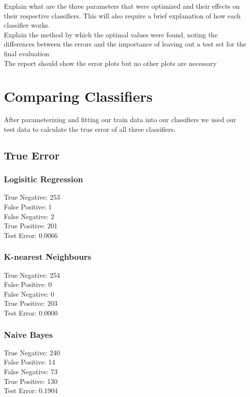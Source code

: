 \documentclass[a4paper]{article}
\newcommand\tab[1][1cm]{\hspace*{#1}}
\begin{document}
Explain what are the three parameters that were optimized and their
effects on their respective classifiers. This will also require a
brief explanation of how each classifier works.\\
Explain the method by which the optimal values were found, noting
the differences between the errors and the importance of leaving out
a test set for the final evaluation\\
The report should show the error plots but no other plots are necessary\\

\section{Comparing Classifiers}

After parameterizing and fitting our train data into our classifiers we used our test data to calculate the true error of all
three classifiers.

\subsection{True Error}

\subsubsection{Logisitic Regression}
	\tab True Negative: 253\\
        	\tab False Positive: 1\\
        	\tab False Negative: 2\\
        	\tab True Positive: 201\\
        	\tab Test Error: 0.0066

\subsubsection{K-nearest Neighbours}
	\tab True Negative: 254\\
        	\tab False Positive: 0\\
        	\tab False Negative: 0\\
        	\tab True Positive: 203\\
        	\tab Test Error: 0.0000

\subsubsection{Naive Bayes}
	\tab True Negative: 240\\
        	\tab False Positive: 14\\
        	\tab False Negative: 73\\
        	\tab True Positive: 130\\
        	\tab Test Error: 0.1904
\end{document}
